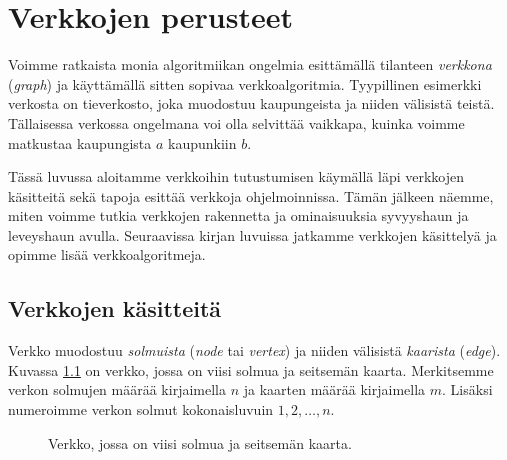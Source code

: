 \chapter{Verkkojen perusteet}


Voimme ratkaista monia algoritmiikan ongelmia
esittämällä tilanteen \emph{verkkona} (\emph{graph}) ja käyttämällä sitten
sopivaa verkkoalgoritmia.
Tyypillinen esimerkki verkosta on tieverkosto,
joka muodostuu kaupungeista ja niiden välisistä teistä.
Tällaisessa verkossa ongelmana voi olla selvittää vaikkapa,
kuinka voimme matkustaa kaupungista $a$ kaupunkiin $b$.

Tässä luvussa aloitamme verkkoihin tutustumisen
käymällä läpi verkkojen käsitteitä sekä tapoja
esittää verkkoja ohjelmoinnissa.
Tämän jälkeen näemme, miten voimme tutkia verkkojen rakennetta
ja ominaisuuksia syvyyshaun ja leveyshaun avulla.
Seuraavissa kirjan luvuissa jatkamme verkkojen käsittelyä ja
opimme lisää verkkoalgoritmeja.

\section{Verkkojen käsitteitä}


Verkko muodostuu \emph{solmuista} (\emph{node} tai \emph{vertex}) ja
niiden välisistä \emph{kaarista} (\emph{edge}).
Kuvassa \ref{fig:veresi} on verkko,
jossa on viisi solmua ja seitsemän kaarta.
Merkitsemme verkon solmujen
määrää kirjaimella $n$ ja kaarten määrää
kirjaimella $m$.
Lisäksi numeroimme verkon solmut kokonaisluvuin
$1,2,\dots,n$.

\begin{figure}
\center
\begin{center}
\end{center}
\caption{Verkko, jossa on viisi solmua ja seitsemän kaarta.}
\label{fig:veresi}
\end{figure}

